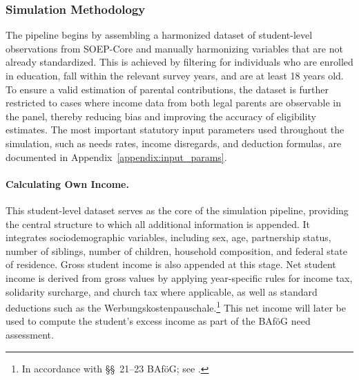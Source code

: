 %


\subsubsection{Simulation Methodology}
The pipeline begins by assembling a harmonized dataset of student-level observations from SOEP-Core and manually harmonizing variables that are not already standardized. 
This is achieved by filtering for individuals who are enrolled in education, fall within the relevant survey years, and are at least 18 years old. 
To ensure a valid estimation of parental contributions, the dataset is further restricted to cases where income data from both legal parents are observable in the panel, thereby reducing bias and improving the accuracy of eligibility estimates. 
The most important statutory input parameters used throughout the simulation, such as needs rates, income disregards, and deduction formulas, are documented in Appendix~\ref{appendix:input_params}.

\paragraph{Calculating Own Income.} 
This student-level dataset serves as the core of the simulation pipeline, providing the central structure to which all additional information is appended. 
It integrates sociodemographic variables, including sex, age, partnership status, number of siblings, number of children, household composition, and federal state of residence. 
Gross student income is also appended at this stage. 
Net student income is derived from gross values by applying year-specific rules for income tax, solidarity surcharge, and church tax where applicable, as well as standard deductions such as the Werbungskostenpauschale.\footnote{In accordance with §§~21–23 BAföG; see \citet{bafoeg_law}.} 
This net income will later be used to compute the student’s excess income as part of the BAföG need assessment.

